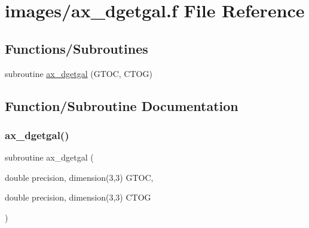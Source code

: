 \hypertarget{ax__dgetgal_8f}{}\section{images/ax\+\_\+dgetgal.f File Reference}
\label{ax__dgetgal_8f}
\subsection*{Functions/\+Subroutines}
\begin{DoxyCompactItemize}
\item 
subroutine \hyperlink{ax__dgetgal_8f_aa033d16f7a6a526329309ec1b0473375}{ax\+\_\+dgetgal} (G\+T\+OC, C\+T\+OG)
\end{DoxyCompactItemize}


\subsection{Function/\+Subroutine Documentation}
\mbox{\label{ax__dgetgal_8f_aa033d16f7a6a526329309ec1b0473375}} 
\subsubsection{\texorpdfstring{ax\+\_\+dgetgal()}{ax\_dgetgal()}}
{\footnotesize\ttfamily subroutine ax\+\_\+dgetgal (\begin{DoxyParamCaption}\item[{double precision, dimension(3,3)}]{G\+T\+OC,  }\item[{double precision, dimension(3,3)}]{C\+T\+OG }\end{DoxyParamCaption})}

